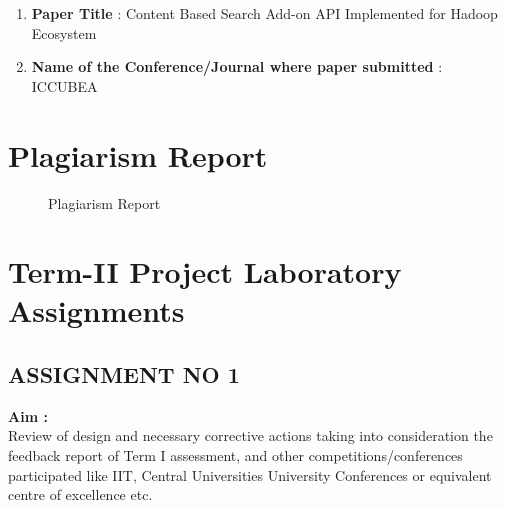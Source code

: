 \documentclass[oneside,a4paper,12pt]{report}
\begin{document}
{\begin{appendices}
\begin{enumerate}
\item \textbf{Paper Title } : Content Based Search Add-on API Implemented for Hadoop Ecosystem
\item \textbf{Name of the Conference/Journal where paper submitted } : ICCUBEA
	
\end{enumerate}


\chapter{Plagiarism Report}
\begin{center}
	\begin{figure}[!htbp]
		\centering
	  \caption{Plagiarism Report}
	  \label{fig:usecase}
	\end{figure}
\end{center}  


\chapter{ Term-II Project Laboratory Assignments}

\section{ASSIGNMENT NO 1}

\textbf{Aim :} \\

Review of design and necessary corrective actions taking into consideration the feedback report of Term I assessment, and other competitions/conferences participated like IIT, Central Universities University Conferences or equivalent centre of excellence etc.
\\


\end{appendices}}
\end{document}
